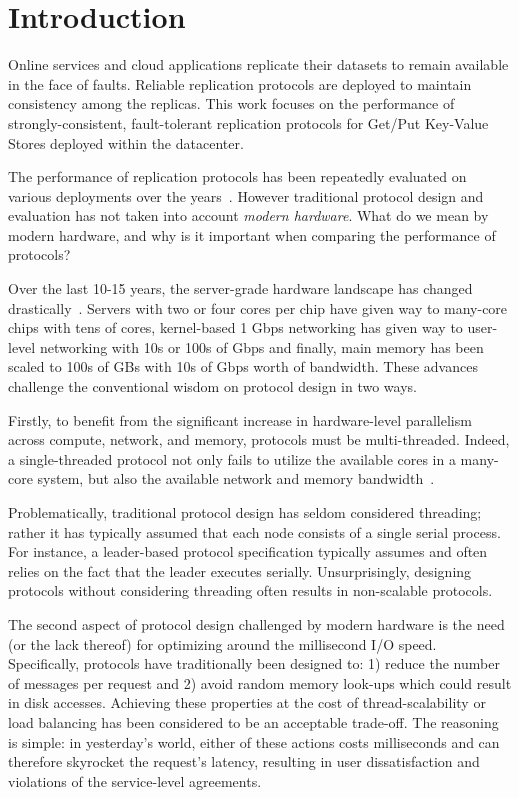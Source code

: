 \section{Introduction}
\label{sec:introduction}


Online services and cloud applications replicate their datasets to remain available in the face of faults. 
Reliable replication protocols are deployed to maintain consistency among the replicas.
This work focuses on the performance of strongly-consistent, fault-tolerant replication protocols for Get/Put Key-Value Stores deployed within the datacenter.

The performance of replication protocols has been repeatedly evaluated on various deployments over the years~\cite{Ailijiang:2019}. However traditional protocol design and evaluation has not taken into account \emph{modern hardware}. 
What do we mean by modern hardware, and why is it important when comparing the performance of protocols?

\custvspace

Over the last 10-15 years, the server-grade hardware landscape has changed drastically~\cite{Barroso:2017}.
Servers with two or four cores per chip have given way to many-core chips with tens of cores, kernel-based 1 Gbps networking has given way to user-level networking with 10s or 100s of Gbps and finally, main memory has been scaled to 100s of GBs with 10s of Gbps worth of bandwidth. 
These advances challenge the conventional wisdom on protocol design in two ways.

\custvspace
Firstly, to benefit from the significant increase in hardware-level parallelism across compute, network, and memory, protocols must be multi-threaded. %
Indeed, a single-threaded protocol not only fails to utilize the available cores in a many-core system, but also the available network and memory bandwidth~\cite{Li:2016,Kalia:2016}.

Problematically, traditional protocol design has seldom considered threading; rather it has typically assumed that each node consists of a single serial process. 
For instance, a leader-based protocol specification typically assumes and often relies on the fact that the leader executes serially.
Unsurprisingly, designing protocols without considering threading often results in non-scalable protocols. %

\custvspace
The second aspect of protocol design challenged by modern hardware is the need (or the lack thereof) for optimizing around the millisecond I/O speed. 
Specifically, protocols have traditionally been designed to: 1) reduce the number of messages per request and 2) avoid random memory look-ups which could result in disk accesses. Achieving these properties at the cost of thread-scalability or load balancing has been considered to be an acceptable trade-off.
The reasoning is simple: in yesterday's world, either of these actions costs milliseconds and can therefore skyrocket the request's latency, resulting in user dissatisfaction and violations of the service-level agreements.


